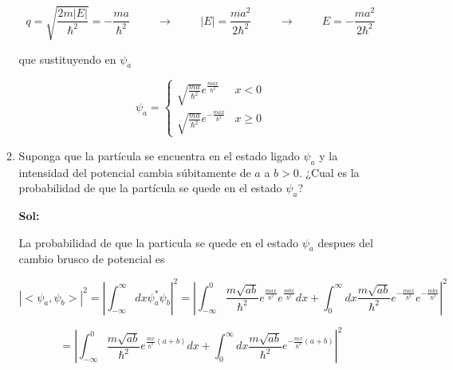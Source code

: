 \documentclass[12pt,a4paper]{article}
\begin{document}
\begin{enumerate}
\begin{enumerate}
        \begin{equation*}
            q = \sqrt{\frac{2m|E|}{\hbar^2}} = -\frac{ma}{\hbar^2} \hspace{1cm} \rightarrow \hspace{1cm} |E| = \frac{ma^2}{2\hbar^2} \hspace{1cm} \rightarrow \hspace{1cm} E = -\frac{ma^2}{2\hbar^2}
        \end{equation*}
        
        que sustituyendo en $\psi_a$
        
        \begin{equation*}
             \psi_{a} = \left\{\begin{array}{lcc}
             \sqrt{\frac{ma}{\hbar^2}} e^{\frac{max}{\hbar^2}}  & x < 0 \\
              \sqrt{\frac{ma}{\hbar^2}} e^{-\frac{max}{\hbar^2}} & x \geq 0
             \end{array} \right.
        \end{equation*}
        
        
        
        \item Suponga que la partícula se encuentra en el estado ligado $\psi_a$ y la intensidad del potencial cambia súbitamente de $a$ a $b>0$. ¿Cual es la probabilidad de que la partícula se quede en el estado $\psi_a$?
        
        \textbf{Sol:}
        
        La probabilidad de que la particula se quede en el estado $\psi_a$ despues del cambio brusco de potencial es
        
        \begin{equation*}
            |<\psi_a, \psi_b>|^2 = \left| \int_{-\infty}^{\infty} dx \psi_{a}^* \psi_b \right|^2 =\left|\int_{-\infty}^{0} \frac{m \sqrt{ab}}{\hbar^2} e^{\frac{max}{\hbar^2}} e^{\frac{mbx}{\hbar^2}} dx + \int_{0}^{\infty} dx\frac{m \sqrt{ab}}{\hbar^2} e^{-\frac{max}{\hbar^2}} e^{-\frac{mbx}{\hbar^2}}\right|^2
        \end{equation*}
        
        \begin{equation*}
            = \left|\int_{-\infty}^{0} \frac{m \sqrt{ab}}{\hbar^2} e^{\frac{mx}{\hbar^2} (a+b)} dx + \int_{0}^{\infty} dx\frac{m \sqrt{ab}}{\hbar^2} e^{-\frac{mx}{\hbar^2}(a+b)}\right|^2 
        \end{equation*}
        

\end{enumerate}
\end{enumerate}
\end{document}
